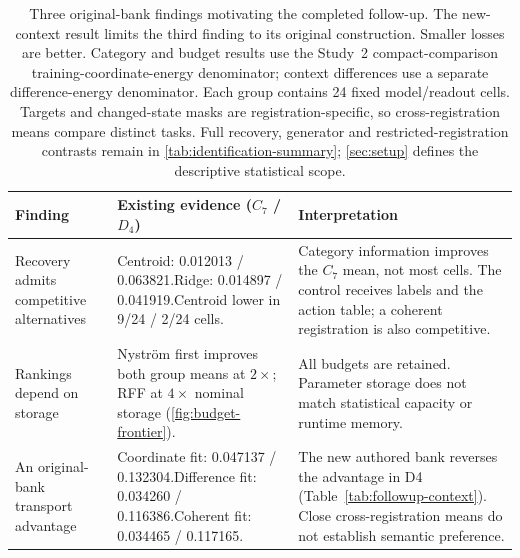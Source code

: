 \begin{table}[t]
\centering\small
\setlength{\tabcolsep}{4pt}
\renewcommand{\arraystretch}{1.10}
\begin{tabular}{@{}p{}p{}p{}@{}}
\toprule
Finding & Existing evidence ($C_7$ / $D_4$) & Interpretation \\
\midrule
Recovery admits competitive alternatives & Centroid: 0.012013 / 0.063821.\newline Ridge: 0.014897 / 0.041919.\newline Centroid lower in 9/24 / 2/24 cells. & Category information improves the $C_7$ mean, not most cells. The control receives labels and the action table; a coherent registration is also competitive. \\
\addlinespace[3pt]
Rankings depend on storage & Nystr\"om first improves both group means at $2\times$; RFF at $4\times$ nominal storage (\cref{fig:budget-frontier}). & All budgets are retained. Parameter storage does not match statistical capacity or runtime memory. \\
\addlinespace[3pt]
An original-bank transport advantage & Coordinate fit: 0.047137 / 0.132304.\newline Difference fit: 0.034260 / 0.116386.\newline Coherent fit: 0.034465 / 0.117165. & The new authored bank reverses the advantage in D4 (Table~\ref{tab:followup-context}). Close cross-registration means do not establish semantic preference. \\
\bottomrule
\end{tabular}
\caption{Three original-bank findings motivating the completed follow-up. The new-context result limits the third finding to its original construction. Smaller losses are better. Category and budget results use the Study~2 compact-comparison training-coordinate-energy denominator; context differences use a separate difference-energy denominator. Each group contains 24 fixed model/readout cells. Targets and changed-state masks are registration-specific, so cross-registration means compare distinct tasks. Full recovery, generator and restricted-registration contrasts remain in \cref{tab:identification-summary}; \cref{sec:setup} defines the descriptive statistical scope.}
\label{tab:main-findings}
\end{table}

